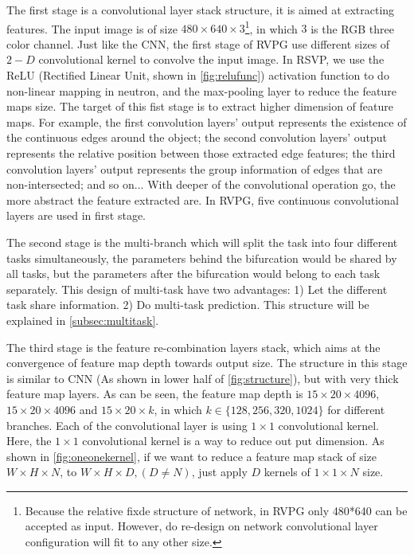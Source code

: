 \begin{spacing}{1.5}
The first stage is a convolutional layer stack structure, it is aimed at extracting features. The input image is of size $480 \times 640 \times 3$\footnote{Because the relative fixde structure of network, in RVPG only 480*640 can be accepted as input. However, do re-design on network convolutional layer configuration will fit to any other size.}, in which $3$ is the RGB three color channel. Just like the CNN, the first stage of RVPG use different sizes of $2-D$ convolutional kernel to convolve the input image. In RSVP, we use the ReLU (Rectified Linear Unit, shown in \autoref{fig:relufunc}) activation function to do non-linear mapping in neutron, and the max-pooling layer to reduce the feature maps size. The target of this fist stage is to extract higher dimension of feature maps. For example, the first convolution layers' output represents the existence of the continuous edges around the object; the second convolution layers' output represents the relative position between those extracted edge features; the third convolution layers' output represents the group information of edges that are non-intersected; and so on... With deeper of the convolutional operation go, the more abstract the feature extracted are. In RVPG, five continuous convolutional layers are used in first stage.

The second stage is the multi-branch which will split the task into four different tasks simultaneously, the parameters behind the bifurcation would be shared by all tasks, but the parameters after the bifurcation would belong to each task separately. This design of multi-task have two advantages: 1) Let the different task share information. 2) Do multi-task prediction. This structure will be explained in \autoref{subsec:multitask}.

The third stage is the feature re-combination layers stack, which aims at the convergence of feature map depth towards output size. The structure in this stage is similar to CNN (As shown in lower half of \autoref{fig:structure}), but with very thick feature map layers. As can be seen, the feature map depth is $15 \times 20 \times 4096$, $15 \times 20 \times 4096$ and $15 \times 20 \times k$, in which $k \in \{128, 256, 320, 1024\}$ for different branches. Each of the convolutional layer is using $1 \times 1$ convolutional kernel. Here, the $1 \times 1$ convolutional kernel is a way to reduce out put dimension. As shown in \autoref{fig:oneonekernel}, if we want to reduce a feature map stack of size $W \times H \times N$, to $W \times H \times D, (D \neq N)$, just apply $D$ kernels of $1 \times 1 \times N$ size.


\end{spacing}
